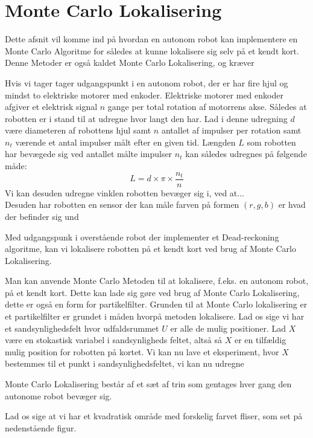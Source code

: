 \documentclass[../../SRP.tex]{subfiles}
\begin{document}
\chapter{Monte Carlo Lokalisering}
Dette afsnit vil komme ind på hvordan en autonom robot kan implementere en Monte Carlo Algoritme for således at kunne lokalisere sig selv på et kendt kort. Denne Metoder er også kaldet Monte Carlo Lokalisering, og kræver  

Hvis vi tager tager udgangspunkt i en autonom robot, der er har fire hjul og mindst to elektriske motorer med enkoder. Elektriske motorer med enkoder afgiver et elektrisk signal $n$ gange per total rotation af motorrens akse. Således at robotten er i stand til at udregne hvor langt den har. Lad i denne udregning $d$ være diameteren af robottens hjul samt $n$ antallet af impulser per rotation samt $n_t$ værende et antal impulser målt efter en given tid. Længden $L$ som robotten har bevægede sig ved antallet målte impulser $n_t$ kan således udregnes på følgende måde:
\begin{equation}
  L = d \times \pi \times \frac{n_t}{n}
\end{equation}
Vi kan desuden udregne vinklen robotten bevæger sig i, ved at... \\

Desuden har robotten en sensor der kan måle farven på formen $(r,g,b)$ er hvad der befinder sig und

Med udgangspunk i overstående robot der implementer et Dead-reckoning algoritme, kan vi lokalisere robotten på et kendt kort ved brug af Monte Carlo Lokalisering.

Man kan anvende Monte Carlo Metoden til at lokalisere, f.eks. en autonom robot, på et kendt kort. Dette kan lade sig gøre ved brug af Monte Carlo Lokalisering, dette er også en form for partikelfilter. Grunden til at Monte Carlo lokalisering er et partikelfilter er grundet i måden hvorpå metoden lokalisere. Lad os sige vi har et sandsynlighedsfelt hvor udfaldsrummet $U$ er alle de mulig positioner. Lad $X$ være en stokastisk variabel i sandsynligheds feltet, altså så $X$ er en tilfældig mulig position for robotten på kortet. Vi kan nu lave et eksperiment, hvor $X$ bestemmes til et punkt i sandsynlighedsfeltet, vi kan nu udregne 

Monte Carlo Lokalisering består af et sæt af trin som gentages hver gang den autonome robot bevæger sig. 

Lad os sige at vi har et kvadratisk område med forskelig farvet fliser, som set på nedenstående figur. \\
\end{document}
